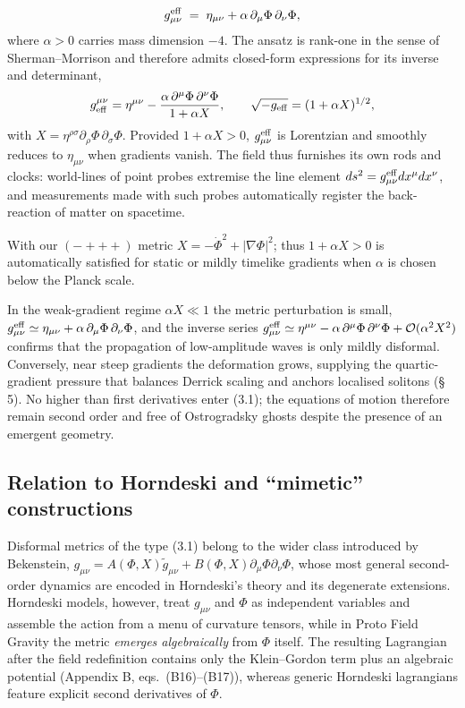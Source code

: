 \documentclass{iopjournal}
\begin{document}
\begin{equation} \label{eq3.1}
g^{\rm eff}_{\mu\nu} \;=\;\eta_{\mu\nu} +\alpha\,\partial_\mu\Phi\,\partial_\nu\Phi,
\end{equation}
where $\alpha>0 $ carries mass dimension $-4$. The ansatz is rank-one in the sense of Sherman--Morrison and therefore admits closed-form expressions for its inverse and determinant,
\begin{equation}\label{eq3.2}
  g_{\rm eff}^{\mu\nu} =\eta^{\mu\nu} -\frac{\alpha\,\partial^{\mu}\Phi\,\partial^{\nu}\Phi}{1+\alpha X}, \qquad \sqrt{-g_{\rm eff}} =(1+\alpha X)^{1/2},
\end{equation}
with $X=\eta^{\rho\sigma}\partial_\rho\Phi\,\partial_\sigma\Phi$. Provided $1+\alpha X>0$, $g^{\rm eff}_{\mu\nu}$ is Lorentzian and smoothly reduces to $\eta_{\mu\nu}$ when gradients vanish. The field thus furnishes its own rods and clocks: world-lines of point probes extremise the line element $ds^{2}=g^{\rm eff}_{\mu\nu}dx^{\mu}dx^{\nu}$, and measurements made with such probes automatically register the back-reaction of matter on spacetime.

With our $(-+++)$ metric $X=-\dot\Phi^{2}+|\nabla\Phi|^{2}$; thus $1+\alpha X>0$ is automatically satisfied for static or mildly timelike gradients when $\alpha$ is chosen below the Planck scale.

In the weak-gradient regime $\alpha X\ll1 $ the metric perturbation is small, $g^{\rm eff}_{\mu\nu}\simeq \eta_{\mu\nu}+\alpha\,\partial_\mu\Phi\,\partial_\nu\Phi$, and the inverse series $g^{\rm eff}_{\mu\nu}\simeq\eta^{\mu\nu}-\alpha\,\partial^{\mu}\Phi\,\partial^{\nu}\Phi+\mathcal O(\alpha^{2}X^{2})$ confirms that the propagation of low-amplitude waves is only mildly disformal. Conversely, near steep gradients the deformation grows, supplying the quartic-gradient pressure that balances Derrick scaling and anchors localised solitons ({\S} 5). No higher than first derivatives enter (3.1); the equations of motion therefore remain second order and free of Ostrogradsky ghosts despite the presence of an emergent geometry.

\subsection{Relation to Horndeski and ``mimetic'' constructions}

Disformal metrics of the type (3.1) belong to the wider class introduced by Bekenstein, $g_{\mu\nu}=A(\Phi,X)\tilde g_{\mu\nu}+B(\Phi,X)\partial_\mu\Phi\partial_\nu\Phi$, whose most general second-order dynamics are encoded in Horndeski's theory and its degenerate extensions. Horndeski models, however, treat $g_{\mu\nu}$ and $\Phi$ as independent variables and assemble the action from a menu of curvature tensors, while in Proto Field Gravity the metric \textit{emerges algebraically} from $\Phi$ itself. The resulting Lagrangian after the field redefinition contains only the Klein--Gordon term plus an algebraic potential (Appendix B, eqs.~(B16)--(B17)), whereas generic Horndeski lagrangians feature explicit second derivatives of $\Phi$.
\end{document}
